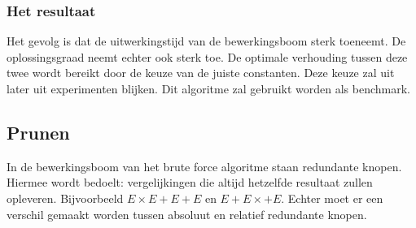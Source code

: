 \documentclass[Main.tex]{subfiles}
\begin{document}
\subsubsection*{Het resultaat}
Het gevolg is dat de uitwerkingstijd van de bewerkingsboom sterk toeneemt. De oplossingsgraad %
neemt echter ook sterk toe. De optimale verhouding tussen deze twee wordt bereikt door de keuze van de juiste constanten. Deze keuze zal uit later uit experimenten blijken. Dit algoritme zal gebruikt worden als benchmark.
\subsection{Prunen}
In de bewerkingsboom van het brute force algoritme staan redundante knopen. Hiermee wordt bedoelt: vergelijkingen die altijd hetzelfde resultaat zullen opleveren. Bijvoorbeeld $E \times E+E+E$ en $E+E \times +E$. Echter moet er een verschil gemaakt worden tussen absoluut en relatief redundante knopen.%
\end{document}
